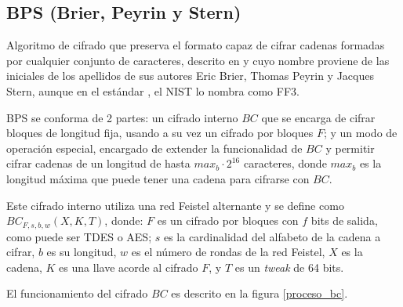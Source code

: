 %
%

\subsection{BPS (Brier, Peyrin y Stern)}


Algoritmo de cifrado que preserva el formato capaz de cifrar cadenas formadas
por cualquier conjunto de caracteres, descrito en \cite{bps} y cuyo nombre
proviene de las iniciales de los apellidos de sus autores Eric Brier, Thomas
Peyrin y Jacques Stern, aunque en el estándar \cite{nist_fpe}, el NIST lo
nombra como FF3.

BPS se conforma de 2 partes: un cifrado interno $BC$ que se encarga de cifrar
bloques de longitud fija, usando a su vez un cifrado por bloques $F$; y un modo
de operación especial, encargado de extender la funcionalidad de $BC$ y permitir
cifrar cadenas de un longitud de hasta $max_b \cdot 2^{16}$ caracteres, donde
$max_b$ es la longitud máxima que puede tener una cadena para cifrarse con $BC$.

Este cifrado interno utiliza una red Feistel alternante y se define como
$BC_{F,s,b,w}(X,K,T)$, donde: $F$ es un cifrado por bloques con $f$ bits de
salida, como puede ser TDES o AES; $s$ es la cardinalidad del alfabeto de la
cadena a cifrar, $b$ es su longitud, $w$ es el número de rondas de la red
Feistel, $X$ es la cadena, $K$ es una llave acorde al cifrado $F$, y $T$ es
un \textit{tweak} de 64 bits.

El funcionamiento del cifrado $BC$ es descrito en la figura \ref{proceso_bc}.

